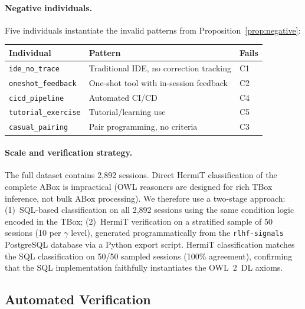 \documentclass[11pt]{article}
\begin{document}
\paragraph{Negative individuals.}
Five individuals instantiate the invalid patterns from Proposition~\ref{prop:negative}:

\begin{center}
\begin{tabular}{@{}lll@{}}
\toprule
\textbf{Individual} & \textbf{Pattern} & \textbf{Fails} \\
\midrule
\texttt{ide\_no\_trace}     & Traditional IDE, no correction tracking & C1 \\
\texttt{oneshot\_feedback}  & One-shot tool with in-session feedback  & C2 \\
\texttt{cicd\_pipeline}     & Automated CI/CD               & C4 \\
\texttt{tutorial\_exercise} & Tutorial/learning use         & C5 \\
\texttt{casual\_pairing}    & Pair programming, no criteria & C3 \\
\bottomrule
\end{tabular}
\end{center}

\paragraph{Scale and verification strategy.}
The full dataset contains 2{,}892 sessions.
Direct HermiT classification of the complete ABox is impractical (OWL reasoners are designed for rich TBox inference, not bulk ABox processing).
We therefore use a two-stage approach: (1)~SQL-based classification on all 2{,}892 sessions using the same condition logic encoded in the TBox; (2)~HermiT verification on a stratified sample of 50 sessions (10 per $\gamma$ level), generated programmatically from the \texttt{rlhf-signals} PostgreSQL database via a Python export script.
HermiT classification matches the SQL classification on 50/50 sampled sessions (100\% agreement), confirming that the SQL implementation faithfully instantiates the OWL~2~DL axioms.

\subsection{Automated Verification}
\label{sec:verification}
\end{document}
